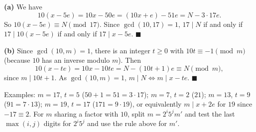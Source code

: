 \textbf{(a)} We have
\[
10(x-5e)=10x-50e=(10x+e)-51e=N-3\cdot17e .
\]
So $10(x-5e)\equiv N\pmod{17}$. Since $\gcd(10,17)=1$, $17\mid N$ if and only if $17\mid10(x-5e)$ if and only if $17\mid x-5e$. $\blacksquare$

\textbf{(b)} Since $\gcd(10,m)=1$, there is an integer $t\ge0$ with $10t\equiv-1\pmod m$ (because $10$ has an inverse modulo $m$). Then
\[
10(x-te)=10x-10te=N-(10t+1)e\equiv N\pmod m,
\]
since $m\mid10t+1$. As $\gcd(10,m)=1$, $m\mid N\iff m\mid x-te$. $\blacksquare$

Examples: $m=17$, $t=5$ ($50+1=51=3\cdot17$); $m=7$, $t=2$ ($21$); $m=13$, $t=9$ ($91=7\cdot13$); $m=19$, $t=17$ ($171=9\cdot19$), or equivalently $m\mid x+2e$ for $19$ since $-17\equiv2$. For $m$ sharing a factor with $10$, split $m=2^i5^jm'$ and test the last $\max(i,j)$ digits for $2^i5^j$ and use the rule above for $m'$.
